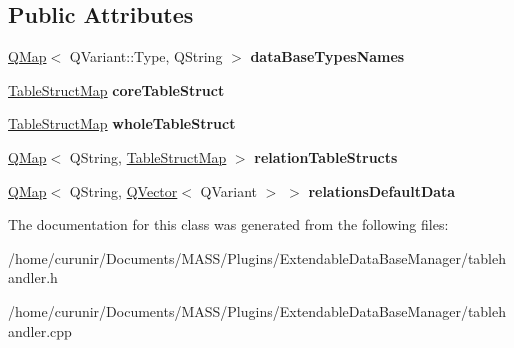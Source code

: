 \subsection*{Public Attributes}
\begin{DoxyCompactItemize}
\item 
\hyperlink{class_q_map}{Q\+Map}$<$ Q\+Variant\+::\+Type, Q\+String $>$ {\bfseries data\+Base\+Types\+Names}\hypertarget{class_table_handler_aebe2c16bead28b9a11ad25e964fbde6a}{}\label{class_table_handler_aebe2c16bead28b9a11ad25e964fbde6a}

\item 
\hyperlink{class_q_map}{Table\+Struct\+Map} {\bfseries core\+Table\+Struct}\hypertarget{class_table_handler_a811ecf820ead8c05091abe036f7684f2}{}\label{class_table_handler_a811ecf820ead8c05091abe036f7684f2}

\item 
\hyperlink{class_q_map}{Table\+Struct\+Map} {\bfseries whole\+Table\+Struct}\hypertarget{class_table_handler_aef50aa5b136d7eb5b7cdb790a05aa54e}{}\label{class_table_handler_aef50aa5b136d7eb5b7cdb790a05aa54e}

\item 
\hyperlink{class_q_map}{Q\+Map}$<$ Q\+String, \hyperlink{class_q_map}{Table\+Struct\+Map} $>$ {\bfseries relation\+Table\+Structs}\hypertarget{class_table_handler_a1dbdb8acc499ed77a36af132fd9f66dd}{}\label{class_table_handler_a1dbdb8acc499ed77a36af132fd9f66dd}

\item 
\hyperlink{class_q_map}{Q\+Map}$<$ Q\+String, \hyperlink{class_q_vector}{Q\+Vector}$<$ Q\+Variant $>$ $>$ {\bfseries relations\+Default\+Data}\hypertarget{class_table_handler_a66165fb2776d61b546db6a5e0a63e604}{}\label{class_table_handler_a66165fb2776d61b546db6a5e0a63e604}

\end{DoxyCompactItemize}


The documentation for this class was generated from the following files\+:\begin{DoxyCompactItemize}
\item 
/home/curunir/\+Documents/\+M\+A\+S\+S/\+Plugins/\+Extendable\+Data\+Base\+Manager/tablehandler.\+h\item 
/home/curunir/\+Documents/\+M\+A\+S\+S/\+Plugins/\+Extendable\+Data\+Base\+Manager/tablehandler.\+cpp\end{DoxyCompactItemize}
